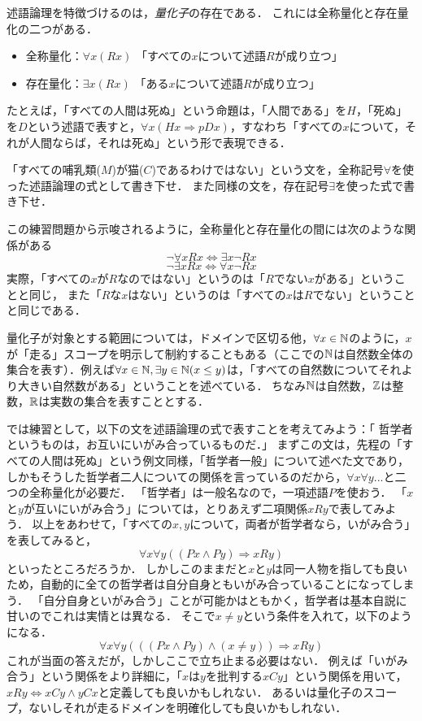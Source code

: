 \documentclass[11pt,a4paper]{jsarticle}
\begin{document}
述語論理を特徴づけるのは，\emph{量化子}の存在である．
これには全称量化と存在量化の二つがある．
\begin{itemize}
 \item 全称量化：$\forall x (Rx)$ 「すべての$x$について述語$R$が成り立つ」
 \item 存在量化：$\exists x (Rx)$ 「ある$x$について述語$R$が成り立つ」
\end{itemize}
たとえば，「すべての人間は死ぬ」という命題は，「人間である」を$H$，「死ぬ」を$D$という述語で表すと，$\forall x (Hx \Rightarrow pDx)$，すなわち「すべての$x$について，それが人間ならば，それは死ぬ」という形で表現できる．

\begin{exercise}
    「すべての哺乳類($M$)が猫($C$)であるわけではない」という文を，全称記号$\forall$を使った述語論理の式として書き下せ．
    また同様の文を，存在記号$\exists$を使った式で書き下せ．
\end{exercise}

この練習問題から示唆されるように，全称量化と存在量化の間には次のような関係がある
\[ \neg \forall x Rx \iff \exists x \neg Rx \]
\[ \neg \exists x Rx \iff \forall x \neg Rx \]
実際，「すべての$x$が$R$なのではない」というのは「$R$でない$x$がある」ということと同じ，
また「$R$な$x$はない」というのは「すべての$x$は$R$でない」ということと同じである．

量化子が対象とする範囲については，ドメインで区切る他，$\forall x \in \mathbb{N}$のように，$x$が「走る」スコープを明示して制約することもある（ここでの$\mathbb{N}$は自然数全体の集合を表す）．例えば$\forall x \in \mathbb{N}, \exists y \in \mathbb{N} (x \leq y)$は，「すべての自然数についてそれより大きい自然数がある」ということを述べている．
ちなみ$\mathbb{N}$は自然数，$\mathbb{Z}$は整数，$\mathbb{R}$は実数の集合を表すこととする．

では練習として，以下の文を述語論理の式で表すことを考えてみよう：「 哲学者というものは，お互いにいがみ合っているものだ．」
まずこの文は，先程の「すべての人間は死ぬ」という例文同様，「哲学者一般」について述べた文であり，しかもそうした哲学者二人についての関係を言っているのだから，$\forall x \forall y...$と二つの全称量化が必要だ．
「哲学者」は一般名なので，一項述語$P$を使おう．
「$x$と$y$が互いにいがみ合う」については，とりあえず二項関係$xRy$で表してみよう．
以上をあわせて，「すべての$x, y$について，両者が哲学者なら，いがみ合う」を表してみると，
\begin{equation}
 \forall x \forall y ((Px \wedge Py) \Rightarrow xRy)
\end{equation}
といったところだろうか．
しかしこのままだと$x$と$y$は同一人物を指しても良いため，自動的に全ての哲学者は自分自身ともいがみ合っていることになってしまう．
「自分自身といがみ合う」ことが可能かはともかく，哲学者は基本自説に甘いのでこれは実情とは異なる．
そこで$x \neq y$という条件を入れて，以下のようになる．
\begin{equation}
 \forall x \forall y (((Px \wedge Py) \wedge (x \neq y)) \Rightarrow xRy)
\end{equation}
これが当面の答えだが，しかしここで立ち止まる必要はない．
例えば「いがみ合う」という関係をより詳細に，「$x$は$y$を批判する$xCy$」という関係を用いて，$xRy \Leftrightarrow xCy \wedge yCx$と定義しても良いかもしれない．
あるいは量化子のスコープ，ないしそれが走るドメインを明確化しても良いかもしれない．
\end{document}
